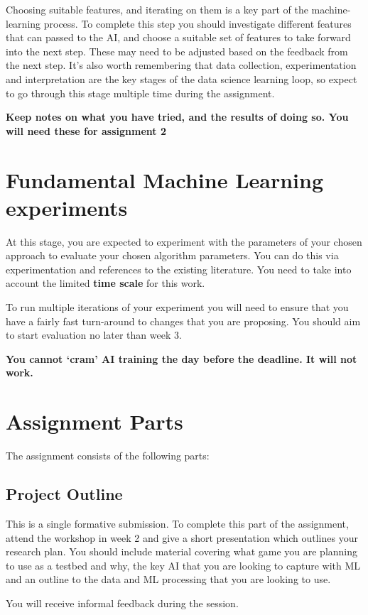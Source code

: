 \documentclass{../fal_assignment}
\begin{document}
Choosing suitable features, and iterating on them is a key part of the machine-learning process. To complete this step you should investigate different features that can passed to the AI, and choose a suitable set of features to take forward into the next step. These may need to be adjusted based on the feedback from the next step. It’s also worth remembering that data collection, experimentation and interpretation are the key stages of the data science learning loop, so expect to go through this stage multiple time during the assignment.

\textbf{Keep notes on what you have tried, and the results of doing so. You will need these for assignment 2}

\section*{Fundamental Machine Learning experiments}
At this stage, you are expected to experiment with the parameters of your chosen approach to evaluate your chosen algorithm parameters. You can do this via experimentation and references to the existing literature. You need to take into account the limited \textbf{time scale} for this work.

To run multiple iterations of your experiment you will need to ensure that you have a fairly fast turn-around to changes that you are proposing. You should aim to start evaluation no later than week 3.

\textbf{You cannot `cram' AI training the day before the deadline. It will not work.}

\section*{Assignment Parts}
The assignment consists of the following parts:

\subsection*{Project Outline}
This is a single formative submission. To complete this part of the assignment, attend the workshop in week 2 and give a short presentation which outlines your research plan. You should include material covering what game you are planning to use as a testbed and why, the key AI that you are looking to capture with ML and an outline to the data and ML processing that you are looking to use.

You will receive informal feedback during the session.
\end{document}
